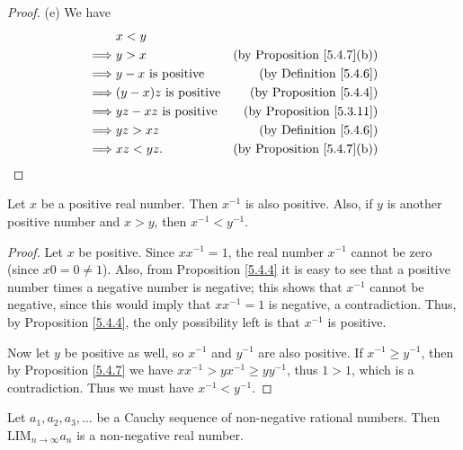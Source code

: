 \begin{proof}{(e)}
    We have
    \begin{align*}
                 & x < y                                                                 \\
        \implies & y > x                        & \text{(by Proposition \ref{5.4.7}(b))} \\
        \implies & y - x \text{ is positive}    & \text{(by Definition \ref{5.4.6})}     \\
        \implies & (y - x)z \text{ is positive} & \text{(by Proposition \ref{5.4.4})}    \\
        \implies & yz - xz \text{ is positive}  & \text{(by Proposition \ref{5.3.11})}   \\
        \implies & yz > xz                      & \text{(by Definition \ref{5.4.6})}     \\
        \implies & xz < yz.                     & \text{(by Proposition \ref{5.4.7}(b))}
    \end{align*}
\end{proof}

\begin{proposition}\label{5.4.8}
    Let \(x\) be a positive real number.
    Then \(x^{-1}\) is also positive.
    Also, if \(y\) is another positive number and \(x > y\), then \(x^{-1} < y^{-1}\).
\end{proposition}

\begin{proof}
    Let \(x\) be positive.
    Since \(xx^{-1} = 1\), the real number \(x^{-1}\) cannot be zero (since \(x0 = 0 \neq 1\)).
    Also, from Proposition \ref{5.4.4} it is easy to see that a positive number times a negative number is negative;
    this shows that \(x^{-1}\) cannot be negative, since this would imply that \(xx^{-1} = 1\) is negative, a contradiction.
    Thus, by Proposition \ref{5.4.4}, the only possibility left is that \(x^{-1}\) is positive.

    Now let \(y\) be positive as well, so \(x^{-1}\) and \(y^{-1}\) are also positive.
    If \(x^{-1} \geq y^{-1}\), then by Proposition \ref{5.4.7} we have \(xx^{-1} > yx^{-1} \geq yy^{-1}\), thus \(1 > 1\), which is a contradiction.
    Thus we must have \(x^{-1} < y^{-1}\).
\end{proof}

\begin{proposition}\label{5.4.9}
    Let \(a_1, a_2, a_3, \dots\) be a Cauchy sequence of non-negative rational numbers.
    Then \(\text{LIM}_{n \to \infty} a_n\) is a non-negative real number.
\end{proposition}


